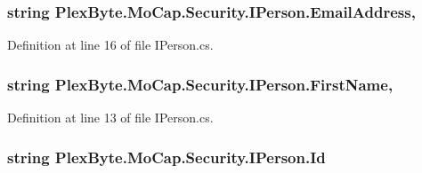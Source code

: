 \subsubsection[{\texorpdfstring{Email\+Address}{EmailAddress}}]{\setlength{\rightskip}{0pt plus 5cm}string Plex\+Byte.\+Mo\+Cap.\+Security.\+I\+Person.\+Email\+Address\hspace{0.3cm}{\ttfamily [get]}, {\ttfamily [set]}}\hypertarget{interface_plex_byte_1_1_mo_cap_1_1_security_1_1_i_person_a4662f6c71cabe18c5448e8d0c34a3c62}{}\label{interface_plex_byte_1_1_mo_cap_1_1_security_1_1_i_person_a4662f6c71cabe18c5448e8d0c34a3c62}


Definition at line 16 of file I\+Person.\+cs.

\subsubsection[{\texorpdfstring{First\+Name}{FirstName}}]{\setlength{\rightskip}{0pt plus 5cm}string Plex\+Byte.\+Mo\+Cap.\+Security.\+I\+Person.\+First\+Name\hspace{0.3cm}{\ttfamily [get]}, {\ttfamily [set]}}\hypertarget{interface_plex_byte_1_1_mo_cap_1_1_security_1_1_i_person_aeddc80d36377ce378de21a5aea8ac574}{}\label{interface_plex_byte_1_1_mo_cap_1_1_security_1_1_i_person_aeddc80d36377ce378de21a5aea8ac574}


Definition at line 13 of file I\+Person.\+cs.

\subsubsection[{\texorpdfstring{Id}{Id}}]{\setlength{\rightskip}{0pt plus 5cm}string Plex\+Byte.\+Mo\+Cap.\+Security.\+I\+Person.\+Id\hspace{0.3cm}{\ttfamily [get]}}\hypertarget{interface_plex_byte_1_1_mo_cap_1_1_security_1_1_i_person_ac9e7eb738b289315473d898eef447acf}{}\label{interface_plex_byte_1_1_mo_cap_1_1_security_1_1_i_person_ac9e7eb738b289315473d898eef447acf}


